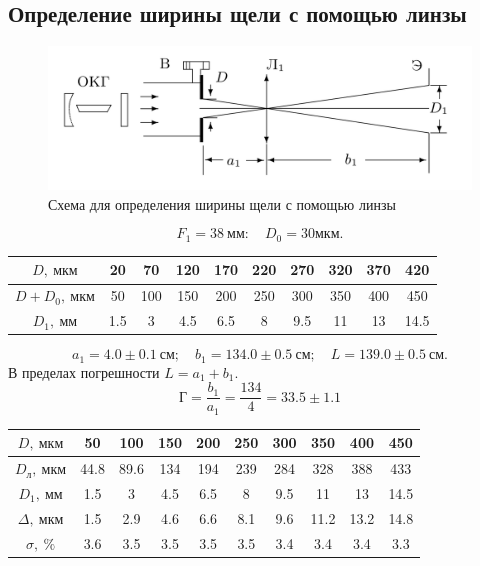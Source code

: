 \documentclass[a4paper, 12pt]{article}%
\begin{document}
\subsection{Определение ширины щели с помощью линзы}
\begin{figure}[H]
	\includegraphics[width = 1.0\linewidth]{pics/1.png}
	\caption*{Схема для определения ширины щели с помощью линзы}
\end{figure}	
\[
 F_1 = 38\ мм: \quad D_0 = 30 мкм.
\]
\begin{table}[H]
	\centering
	\begin{tabular}{|c|c|c|c|c|c|c|c|c|c|}  \hline
	$D,\ мкм$ & 20 & 70 & 120 & 170 & 220 & 270 & 320 & 370 & 420 \\\hline
	$D + D_0,\ мкм$ & 50 & 100 & 150 & 200 & 250 & 300 & 350 & 400 & 450 \\\hline
	$D_1,\ мм$ & 1.5 & 3 & 4.5 & 6.5 & 8 & 9.5 & 11 & 13 & 14.5 \\\hline
	\end{tabular}
	\end{table}
\[
	a_1 = 4.0 \pm 0.1\ см; \quad b_1 = 134.0 \pm 0.5\ см; \quad L = 139.0 \pm 0.5\ см.
\]
В пределах погрешности $L = a_1 + b_1$. 
\[
\text{Г} = \frac{b_1}{a_1} = \frac{134}{4} = 33.5 \pm 1.1
\]
\begin{table}[H]
	\centering
	\begin{tabular}{|c|c|c|c|c|c|c|c|c|c|}  \hline
	$D,\ мкм$ & 50 & 100 & 150 & 200 & 250 & 300 & 350 & 400 & 450 \\\hline
	$D_{\text{л}},\ мкм$ &  44.8 & 89.6 & 134 & 194 & 239 & 284 & 328 & 388 & 433 \\\hline
	$D_1,\ мм$ & 1.5 & 3 & 4.5 & 6.5 & 8 & 9.5 & 11 & 13 & 14.5 \\\hline
	$\Delta,\ мкм$ & 1.5 &2.9 & 4.6 & 6.6 & 8.1 & 9.6 & 11.2 & 13.2 & 14.8 \\\hline
	$\sigma,\ \%$ &	 3.6 & 3.5 & 3.5 & 3.5 & 3.5 & 3.4 & 3.4 & 3.4 & 3.3 \\\hline
	\end{tabular}
	\end{table}
	
\end{document}
